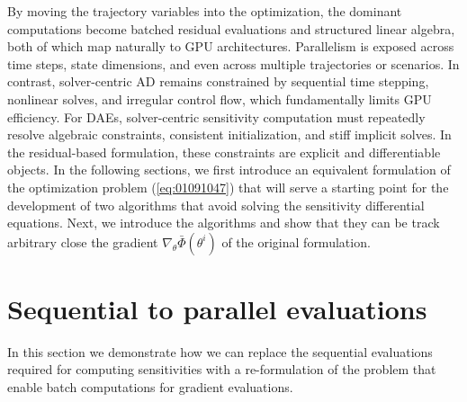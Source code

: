 By moving the trajectory variables into the optimization, the dominant computations become batched residual evaluations and structured linear algebra, both of which map naturally to GPU architectures. Parallelism is exposed across time steps, state dimensions, and even across multiple trajectories or scenarios. In contrast, solver-centric AD remains constrained by sequential time stepping, nonlinear solves, and irregular control flow, which fundamentally limits GPU efficiency. For DAEs, solver-centric sensitivity computation must repeatedly resolve algebraic constraints, consistent initialization, and stiff implicit solves. In the residual-based formulation, these constraints are explicit and differentiable objects. In the following sections, we first introduce an equivalent formulation of the optimization problem (\ref{eq:01091047}) that will serve a starting point for the development of two algorithms that avoid solving the sensitivity differential equations. Next, we introduce the algorithms and show that they can be track arbitrary close the gradient $\nabla_{ \theta} \bar\Phi({\theta}^i)$ of the original formulation.


\section{Sequential to parallel evaluations}

In this section we demonstrate how we can replace the sequential evaluations required for computing sensitivities with a re-formulation of the problem that enable batch computations for gradient evaluations. 

